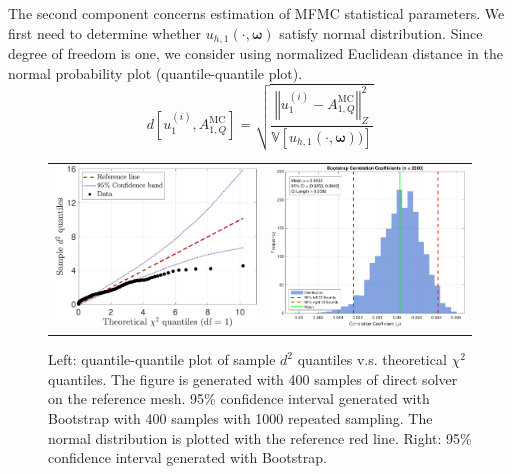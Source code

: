 The second component concerns estimation of MFMC statistical parameters. We first need to determine whether $u_{h,1}(\cdot, \boldsymbol{\omega})$ satisfy normal distribution. Since degree of freedom is one, we consider using normalized Euclidean distance in the normal probability plot (quantile-quantile plot).
\[
d\left[u_{1}^{(i)}, A_{1,Q}^{\text{MC}}\right] = \sqrt{\frac{\left\Vert u_{1}^{(i)} - A_{1,Q}^{\text{MC}}\right\Vert_Z^2}{\mathbb{V}\left[u_{h,1}(\cdot, \boldsymbol{\omega}))\right]}}
\]

%
\begin{figure}[ht!]\centering
\begin{tabular}{cc}
\includegraphics[height=0.36\linewidth]{./figures/test_normal.pdf}&
\includegraphics[height=0.36\linewidth]{./figures/CI_bootstrap.pdf}
\end{tabular}
\caption{Left: quantile-quantile plot of sample $d^2$ quantiles v.s. theoretical $\chi^2$ quantiles. The figure is generated with 400 samples of direct solver on the reference mesh. 95\% confidence interval generated with Bootstrap with 400 samples with 1000 repeated sampling. The normal distribution is plotted with the reference red line. Right: 95\% confidence interval generated with Bootstrap.}
\label{fig:Test_normal}
\end{figure}
%

